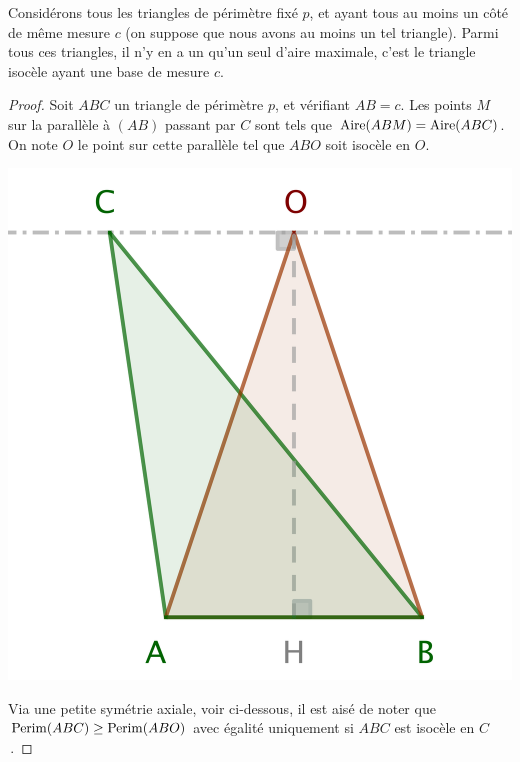 \begin{fact}\label{iso-tri-one-side-fixed}
	Considérons tous les triangles de périmètre fixé $p$, et ayant tous au moins un côté de même mesure $c$ (on suppose que nous avons au moins un tel triangle).
	Parmi tous ces triangles, il n'y en a un qu'un seul d'aire maximale, c'est le triangle isocèle ayant une base de mesure $c$.
\end{fact}


\begin{proof}
	Soit $ABC$ un triangle de périmètre $p$, et vérifiant $AB = c$. Les points $M$ sur la parallèle à $(AB)$ passant par $C$ sont tels que $\mathrm{Aire}(ABM) = \mathrm{Aire}(ABC)$. On note $O$ le point sur cette parallèle tel que $ABO$ soit isocèle en $O$.

	\begin{center}
		\includegraphics[scale=.4]{content/triangle-one-side-fixed/triangle.png}
	\end{center}

	
	Via une petite symétrie axiale, voir ci-dessous, il est aisé de noter que $\mathrm{Perim}(ABC) \geq \mathrm{Perim}(ABO)$ avec égalité uniquement si $ABC$ est isocèle en $C$\,.
	

\end{proof}
